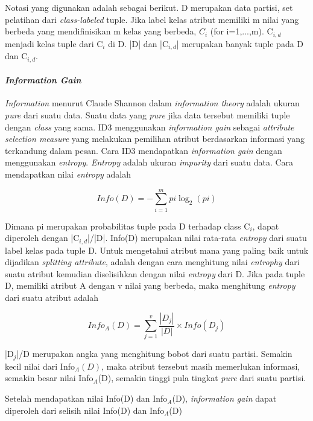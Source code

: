 Notasi yang digunakan adalah sebagai berikut. D merupakan data partisi, set pelatihan dari \textsl{class-labeled} tuple. Jika label kelas atribut memiliki m nilai yang berbeda yang mendifinisikan m kelas yang berbeda, $C_{i}$ (for i=1,...,m). C$_{i,d}$ menjadi kelas tuple dari C$_{i}$ di D. |D| dan |C$_{i,d}$| merupakan banyak tuple pada D dan C$_{i,d}$.

\paragraph{\textsl{Information Gain}}

\textsl{Information} menurut Claude Shannon dalam \textsl{information theory} adalah ukuran \textsl{pure} dari suatu data. Suatu data yang \textsl{pure} jika data tersebut memiliki tuple dengan \textsl{class} yang sama. ID3 menggunakan \textsl{information gain} sebagai \textsl{attribute selection measure} yang melakukan pemilihan atribut berdasarkan informasi yang terkandung dalam pesan. Cara ID3 mendapatkan \textsl{information gain} dengan menggunakan \textsl{entropy}. \textsl{Entropy} adalah ukuran \textsl{impurity} dari suatu data. Cara mendapatkan nilai \textsl{entropy} adalah

\begin{displaymath}
	Info(D) = -\sum_{i=1}^{m} pi \log_2(pi)
\end{displaymath}

Dimana pi merupakan probabilitas tuple pada D terhadap class C$_{i}$, dapat diperoleh dengan |C$_{i,d}$|/|D|. Info(D) merupakan nilai rata-rata \textsl{entropy} dari suatu label kelas pada tuple D. Untuk mengetahui atribut mana yang paling baik untuk dijadikan \textsl{splitting attribute}, adalah dengan cara menghitung nilai \textsl{entrophy} dari suatu atribut kemudian diselisihkan dengan nilai \textsl{entropy} dari D. Jika pada tuple D, memiliki atribut A dengan v nilai yang berbeda, maka menghitung \textsl{entropy} dari suatu atribut adalah

\begin{displaymath}
	Info_A(D) = \sum_{j=1}^v \frac{|D_j|}{|D|} \times Info(D_j)
\end{displaymath}

|D$_{j}$|/D merupakan angka yang menghitung bobot dari suatu partisi. Semakin kecil nilai dari Info$_{A}(D)$, maka atribut tersebut masih memerlukan informasi, semakin besar nilai Info$_{A}$(D), semakin tinggi pula tingkat \textsl{pure} dari suatu partisi.

Setelah mendapatkan nilai Info(D) dan Info$_{A}$(D), \textsl{information gain} dapat diperoleh dari selisih nilai Info(D) dan Info$_{A}$(D)

